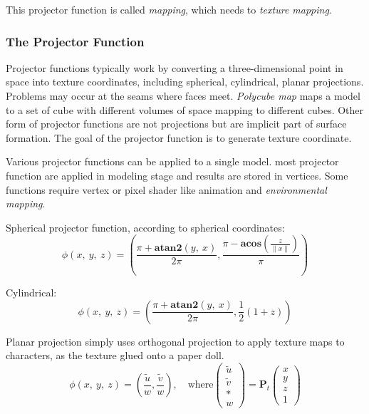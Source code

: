 \documentclass[10pt, a4paper]{article}
\begin{document}
    This projector function is called \emph{mapping}, which needs to \emph{texture mapping}.

    \subsubsection{The Projector Function}
        Projector functions typically work by converting a three-dimensional point in space into texture coordinates, including spherical, cylindrical, planar projections. Problems may occur at the seams where faces meet. \emph{Polycube map} maps a model to a set of cube with different volumes of space mapping to different cubes. Other form of projector functions are not projections but are implicit part of surface formation. The goal of the projector function is to generate texture coordinate. 

        Various projector functions can be applied to a single model. most projector function are applied in modeling stage and results are stored in vertices. Some functions require vertex or pixel shader like animation and \emph{environmental mapping}.

        Spherical projector function, according to spherical coordinates: 
        $$\phi(x,\ y,\ z) = (\frac{\pi + \textbf{atan2}(y,\ x)}{2\pi}, \frac{\pi - \textbf{acos}(\frac{z}{\parallel x \parallel})}{\pi})$$

        Cylindrical:
        $$\phi(x,\ y,\ z) = (\frac{\pi + \textbf{atan2}(y,\ x)}{2\pi}, \frac{1}{2}(1 + z))$$
        
        Planar projection simply uses orthogonal projection to apply texture maps to characters, as the texture glued onto a paper doll. 
        \begin{equation*}
            \phi(x,\ y,\ z) = (\frac{\tilde{u}}{w}, \frac{\tilde{v}}{w}), \quad \text{where}
            \begin{pmatrix}
                \tilde{u} \\
                \tilde{v} \\
                * \\
                w 
            \end{pmatrix}
            = \textbf{P}_t
            \begin{pmatrix}
                x \\
                y \\
                z \\
                1
            \end{pmatrix}
        \end{equation*}
\end{document}

